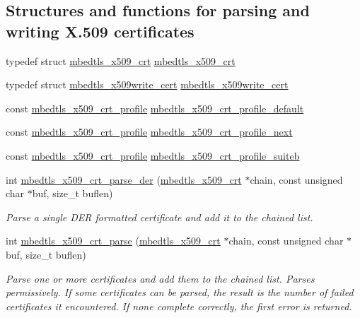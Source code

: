 \subsection*{Structures and functions for parsing and writing X.509 certificates}
\begin{DoxyCompactItemize}
\item 
typedef struct \mbox{\hyperlink{structmbedtls__x509__crt}{mbedtls\+\_\+x509\+\_\+crt}} \mbox{\hyperlink{group__x509__module_ga836544fec94d5bc02bc97aa87885b9d9}{mbedtls\+\_\+x509\+\_\+crt}}
\item 
typedef struct \mbox{\hyperlink{structmbedtls__x509write__cert}{mbedtls\+\_\+x509write\+\_\+cert}} \mbox{\hyperlink{group__x509__module_gacc3115587f8d882a7a137c38d6939e07}{mbedtls\+\_\+x509write\+\_\+cert}}
\item 
const \mbox{\hyperlink{structmbedtls__x509__crt__profile}{mbedtls\+\_\+x509\+\_\+crt\+\_\+profile}} \mbox{\hyperlink{group__x509__module_ga9cd2de10ffeff0f339abcc1ba7e26fdf}{mbedtls\+\_\+x509\+\_\+crt\+\_\+profile\+\_\+default}}
\item 
const \mbox{\hyperlink{structmbedtls__x509__crt__profile}{mbedtls\+\_\+x509\+\_\+crt\+\_\+profile}} \mbox{\hyperlink{group__x509__module_ga8ab1f8a044fd25f76ecb4ba15c6d5bcd}{mbedtls\+\_\+x509\+\_\+crt\+\_\+profile\+\_\+next}}
\item 
const \mbox{\hyperlink{structmbedtls__x509__crt__profile}{mbedtls\+\_\+x509\+\_\+crt\+\_\+profile}} \mbox{\hyperlink{group__x509__module_gaf09067a39129236125e353a68ceb45d6}{mbedtls\+\_\+x509\+\_\+crt\+\_\+profile\+\_\+suiteb}}
\item 
int \mbox{\hyperlink{group__x509__module_ga003c2483a2691e025641fa9d68d4a96a}{mbedtls\+\_\+x509\+\_\+crt\+\_\+parse\+\_\+der}} (\mbox{\hyperlink{structmbedtls__x509__crt}{mbedtls\+\_\+x509\+\_\+crt}} $\ast$chain, const unsigned char $\ast$buf, size\+\_\+t buflen)
\begin{DoxyCompactList}\small\item\em Parse a single D\+ER formatted certificate and add it to the chained list. \end{DoxyCompactList}\item 
int \mbox{\hyperlink{group__x509__module_ga033567483649030f7f859db4f4cb7e14}{mbedtls\+\_\+x509\+\_\+crt\+\_\+parse}} (\mbox{\hyperlink{structmbedtls__x509__crt}{mbedtls\+\_\+x509\+\_\+crt}} $\ast$chain, const unsigned char $\ast$buf, size\+\_\+t buflen)
\begin{DoxyCompactList}\small\item\em Parse one or more certificates and add them to the chained list. Parses permissively. If some certificates can be parsed, the result is the number of failed certificates it encountered. If none complete correctly, the first error is returned. \end{DoxyCompactList}\item 

\end{DoxyCompactItemize}
